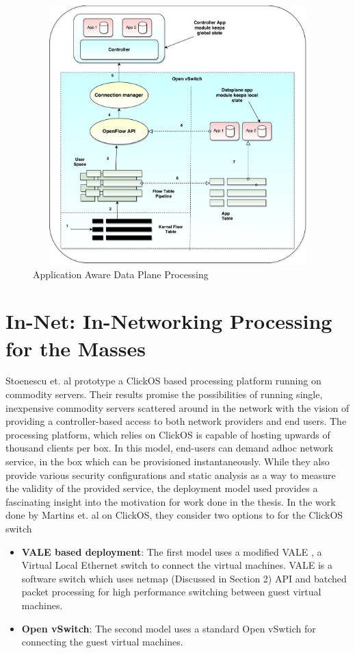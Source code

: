  \begin{figure}[H]
 \centering
 \caption{Application Aware Data Plane Processing} 
 \includegraphics[height=10cm,width=13cm]{appaware01.pdf} 
\end{figure}


\section{In-Net: In-Networking Processing for the Masses}
Stoenescu et. al \cite{NpForMasses} prototype a ClickOS based \cite{martins2014clickos} processing platform running on commodity servers. Their results promise the possibilities of running single, inexpensive commodity servers scattered around in the network with the vision of providing a controller-based access to both network providers and end users. The processing platform, which relies on ClickOS is capable of hosting upwards of thousand clients per box. In this model, end-users can demand adhoc network service, in the box which can be provisioned instantaneously. While they also provide various security configurations and static analysis as a way to measure the validity of the provided service, the deployment model used provides a fascinating insight into the motivation for work done in the thesis. 
In the work done by Martins et. al on ClickOS, they consider two options to for the ClickOS switch

\begin{itemize}
 \item \textbf{VALE based deployment}: The first model uses a modified VALE \cite{Rizzo:2012:VSE:2413176.2413185}, a Virtual Local Ethernet switch to connect the virtual machines. VALE is a software switch which uses netmap (Discussed in Section 2) API and batched packet processing for high performance switching between guest virtual machines.
 \item \textbf{Open vSwitch}: The second model uses a standard Open vSwtich for connecting the guest virtual machines.
\end{itemize}

